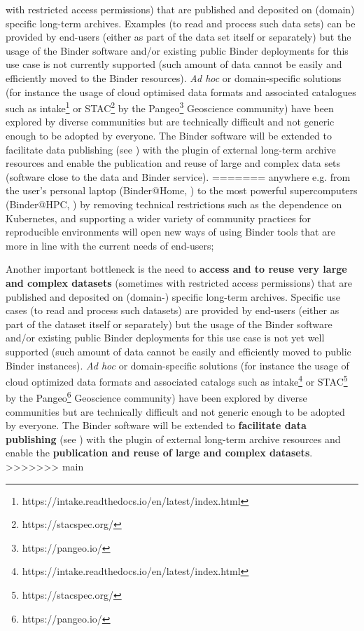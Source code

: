 \begin{compactitem}
      with restricted access permissions) that are published and deposited on (domain) specific long-term archives.
      Examples (to read and process such data sets) can be provided by end-users (either as part of the data set
      itself or separately) but the usage of the Binder software and/or existing public Binder deployments for
      this use case is not currently supported (such amount of data cannot be easily and efficiently moved to
      the Binder resources). \emph{Ad hoc} or domain-specific solutions (for instance the usage of cloud optimised
      data formats and associated catalogues such as intake\footnote{https://intake.readthedocs.io/en/latest/index.html}
      or STAC\footnote{https://stacspec.org/} by the Pangeo\footnote{https://pangeo.io/} Geoscience community)
      have been explored by diverse communities but are technically difficult and not generic enough to be
      adopted by everyone. The Binder software will be extended to facilitate data publishing (see ) with
      the plugin of external long-term archive resources and enable the publication and reuse of large and complex data sets (software close to
      the data and Binder service).
=======
      anywhere e.g. from the user’s personal laptop (Binder@Home, ) to the
      most powerful supercomputers (Binder@HPC, )
      by removing technical restrictions such as the dependence on Kubernetes,
      and supporting a wider variety of community practices for reproducible environments
      will open new ways of using Binder tools that are more in line with the current needs of end-users;
\item Another important bottleneck is the need to \textbf{access and to reuse very large and complex datasets} (sometimes
      with restricted access permissions) that are published and deposited on (domain-) specific long-term archives.
      Specific use cases (to read and process such datasets) are provided by end-users (either as part of the dataset
      itself or separately) but the usage of the Binder software and/or existing public Binder deployments for
      this use case is not yet well supported (such amount of data cannot be easily and efficiently moved to
      public Binder instances).
      \emph{Ad hoc} or domain-specific solutions (for instance the usage of cloud optimized
      data formats and associated catalogs such as intake\footnote{https://intake.readthedocs.io/en/latest/index.html}
      or STAC\footnote{https://stacspec.org/} by the Pangeo\footnote{https://pangeo.io/} Geoscience community)
      have been explored by diverse communities but are technically difficult and not generic enough to be
      adopted by everyone. The Binder software will be extended to \textbf{facilitate data publishing} (see ) with
      the plugin of external long-term archive resources and enable the \textbf{publication and reuse of large and complex datasets}.
>>>>>>> main
\end{compactitem}


